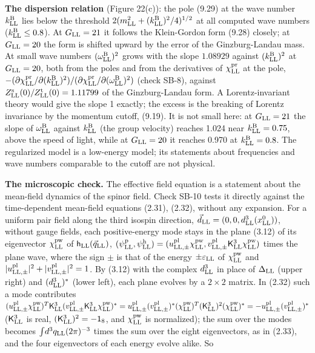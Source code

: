 \documentclass[
  10pt,
]{article}
\begin{document}
\textbf{The dispersion relation} (Figure 22(c)): the pole (9.29) at the
wave number \(k^{\rm B}_{\rm LL}\) lies below the threshold
\(2(m_{\rm LL}^2+(k^{\rm B}_{\rm LL})^2/4)^{1/2}\) at all computed wave
numbers (\(k^{\rm B}_{\rm LL}\le0.8\)). At \(G_{\rm LL}=21\) it follows
the Klein-Gordon form (9.28) closely; at \(G_{\rm LL}=20\) the form is
shifted upward by the error of the Ginzburg-Landau mass. At small wave
numbers \((\omega^{\rm B}_{\rm LL})^2\) grows with the slope \(1.08929\)
against \((k^{\rm B}_{\rm LL})^2\) at \(G_{\rm LL}=20\), both from the
poles and from the derivatives of \(\chi^{\rm pr}_{\rm LL}\) at the
pole,
\(-(\partial\chi^{\rm pr}_{\rm LL}/\partial(k^{\rm B}_{\rm LL})^2)/(\partial\chi^{\rm pr}_{\rm LL}/\partial(\omega^{\rm B}_{\rm LL})^2)\)
(check SB-8), against
\(Z^{\rm s}_{\rm LL}(0)/Z^{\rm t}_{\rm LL}(0)=1.11799\) of the
Ginzburg-Landau form. A Lorentz-invariant theory would give the slope 1
exactly; the excess is the breaking of Lorentz invariance by the
momentum cutoff, (9.19). It is not small here: at \(G_{\rm LL}=21\) the
slope of \(\omega^{\rm B}_{\rm LL}\) against \(k^{\rm B}_{\rm LL}\) (the
group velocity) reaches 1.024 near \(k^{\rm B}_{\rm LL}=0.75\), above
the speed of light, while at \(G_{\rm LL}=20\) it reaches 0.970 at
\(k^{\rm B}_{\rm LL}=0.8\). The regularized model is a low-energy model;
its statements about frequencies and wave numbers comparable to the
cutoff are not physical.

\textbf{The microscopic check.} The effective field equation is a
statement about the mean-field dynamics of the spinor field. Check SB-10
tests it directly against the time-dependent mean-field equations
(2.31), (2.32), without any expansion. For a uniform pair field along
the third isospin direction,
\(\vec d_{\rm LL}=(0,0,d^3_{\rm LL}(x^0_{\rm LL}))\), without gauge
fields, each positive-energy mode stays in the plane (3.12) of its
eigenvector \(\chi^{\rm pw}_{\rm LL}\) of
\(\mathsf h_{\rm LL}(\vec q_{\rm LL})\),
\((\psi^{\rm p}_{\rm LL},\psi^{\rm h}_{\rm LL})=(u^{\rm pl}_{{\rm LL},\pm}\chi^{\rm pw}_{\rm LL},v^{\rm pl}_{{\rm LL},\pm}\mathsf K^3_{\rm LL}\chi^{\rm pw}_{\rm LL})\)
times the plane wave, where the sign \(\pm\) is that of the energy
\(\pm\varepsilon_{\rm LL}\) of \(\chi^{\rm pw}_{\rm LL}\) and
\(\lvert u^{\rm pl}_{{\rm LL},\pm}\rvert^2+\lvert v^{\rm pl}_{{\rm LL},\pm}\rvert^2=1\).
By (3.12) with the complex \(d^3_{\rm LL}\) in place of
\(\Delta_{\rm LL}\) (upper right) and \((d^3_{\rm LL})^*\) (lower left),
each plane evolves by a \(2\times2\) matrix. In (2.32) such a mode
contributes
\((u^{\rm pl}_{{\rm LL},\pm}\chi^{\rm pw}_{\rm LL})^T\mathsf K^3_{\rm LL}(v^{\rm pl}_{{\rm LL},\pm}\mathsf K^3_{\rm LL}\chi^{\rm pw}_{\rm LL})^*=u^{\rm pl}_{{\rm LL},\pm}(v^{\rm pl}_{{\rm LL},\pm})^*(\chi^{\rm pw}_{\rm LL})^T(\mathsf K^3_{\rm LL})^2(\chi^{\rm pw}_{\rm LL})^*=-u^{\rm pl}_{{\rm LL},\pm}(v^{\rm pl}_{{\rm LL},\pm})^*\)
(\(\mathsf K^3_{\rm LL}\) is real,
\((\mathsf K^3_{\rm LL})^2=-\mathsf 1_8\), and
\(\chi^{\rm pw}_{\rm LL}\) is normalized); the sum over the modes
becomes \(\int\!d^3q_{\rm LL}(2\pi)^{-3}\) times the sum over the eight
eigenvectors, as in (2.33), and the four eigenvectors of each energy
evolve alike. So
\end{document}
